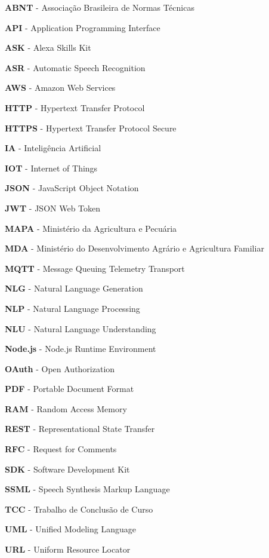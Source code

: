 \makeatletter
{}
\makeatother

\renewcommand{\baselinestretch}{1.5}\selectfont
\setlength{\parskip}{0pt}

\begin{flushleft}

\textbf{ABNT} - Associação Brasileira de Normas Técnicas

\textbf{API} - Application Programming Interface

\textbf{ASK} - Alexa Skills Kit

\textbf{ASR} - Automatic Speech Recognition

\textbf{AWS} - Amazon Web Services

\textbf{HTTP} - Hypertext Transfer Protocol

\textbf{HTTPS} - Hypertext Transfer Protocol Secure

\textbf{IA} - Inteligência Artificial

\textbf{IOT} - Internet of Things

\textbf{JSON} - JavaScript Object Notation

\textbf{JWT} - JSON Web Token

\textbf{MAPA} - Ministério da Agricultura e Pecuária

\textbf{MDA} - Ministério do Desenvolvimento Agrário e Agricultura Familiar

\textbf{MQTT} - Message Queuing Telemetry Transport

\textbf{NLG} - Natural Language Generation

\textbf{NLP} - Natural Language Processing

\textbf{NLU} - Natural Language Understanding

\textbf{Node.js} - Node.js Runtime Environment

\textbf{OAuth} - Open Authorization

\textbf{PDF} - Portable Document Format

\textbf{RAM} - Random Access Memory

\textbf{REST} - Representational State Transfer

\textbf{RFC} - Request for Comments

\textbf{SDK} - Software Development Kit

\textbf{SSML} - Speech Synthesis Markup Language

\textbf{TCC} - Trabalho de Conclusão de Curso

\textbf{UML} - Unified Modeling Language

\textbf{URL} - Uniform Resource Locator


\end{flushleft}

\renewcommand{\baselinestretch}{1.0}\selectfont
\setlength{\parskip}{\baselineskip}
